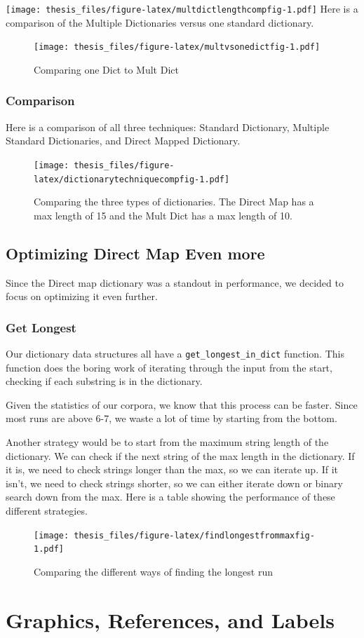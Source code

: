 \documentclass[12pt,twoside]{reedthesis}
\begin{document}
\texttt{[image: thesis\_files/figure-latex/multdictlengthcompfig-1.pdf]}
Here is a comparison of the Multiple Dictionaries versus one standard dictionary.
\begin{figure}
\centering
\texttt{[image: thesis\_files/figure-latex/multvsonedictfig-1.pdf]}
\caption{\label{fig:multvsonedictfig}Comparing one Dict to Mult Dict}
\end{figure}
\hypertarget{comparison}{%
\subsection{Comparison}\label{comparison}}

Here is a comparison of all three techniques: Standard Dictionary, Multiple Standard Dictionaries, and Direct Mapped Dictionary.
\begin{figure}
\centering
\texttt{[image: thesis\_files/figure-latex/dictionarytechniquecompfig-1.pdf]}
\caption{\label{fig:dictionarytechniquecompfig}Comparing the three types of dictionaries. The Direct Map has a max length of 15 and the Mult Dict has a max length of 10.}
\end{figure}
\hypertarget{optimizing-direct-map-even-more}{%
\section{Optimizing Direct Map Even more}\label{optimizing-direct-map-even-more}}

Since the Direct map dictionary was a standout in performance, we decided to focus on optimizing it even further.

\hypertarget{get-longest}{%
\subsection{Get Longest}\label{get-longest}}

Our dictionary data structures all have a \texttt{get\_longest\_in\_dict} function. This function does the boring work of iterating through the input from the start, checking if each substring is in the dictionary.

Given the statistics of our corpora, we know that this process can be faster. Since most runs are above 6-7, we waste a lot of time by starting from the bottom.

Another strategy would be to start from the maximum string length of the dictionary. We can check if the next string of the max length in the dictionary. If it is, we need to check strings longer than the max, so we can iterate up. If it isn't, we need to check strings shorter, so we can either iterate down or binary search down from the max. Here is a table showing the performance of these different strategies.
\begin{figure}
\centering
\texttt{[image: thesis\_files/figure-latex/findlongestfrommaxfig-1.pdf]}
\caption{\label{fig:findlongestfrommaxfig}Comparing the different ways of finding the longest run}
\end{figure}
\hypertarget{ref-labels}{%
\chapter{Graphics, References, and Labels}\label{ref-labels}}
\end{document}

